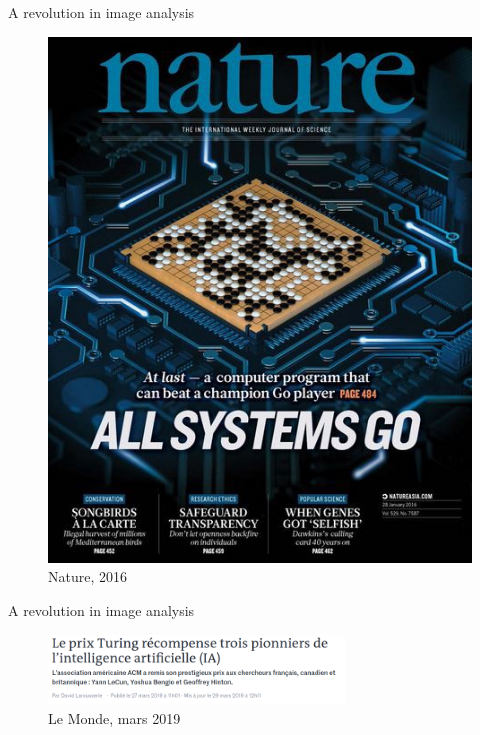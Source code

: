 \documentclass[xcolor=pdftex,dvipsnames,table,mathserif]{beamer}
\begin{document}
\begin{frame}{A revolution in image analysis}

\begin{figure}[ht]
  \centering
  \includegraphics[height=0.5\textheight]{nature_go}
  \caption{Nature, 2016}
\end{figure}


\end{frame}


\begin{frame}{A revolution in image analysis}

\begin{figure}[ht]
  \centering
  \includegraphics[width=0.7\textwidth]{lemonde27mars2019}
  \caption{Le Monde, mars 2019}
\end{figure}


\end{frame}
\end{document}

